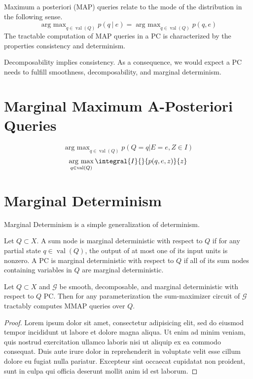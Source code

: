 \documentclass[9pt,fleqn,twoside,twocolumn]{stdglobal}
\DeclareMathOperator*{\argmax}{arg\ max}
\DeclareMathOperator{\val}{val}
\begin{document}
  Maximum a posteriori (MAP) queries relate to the mode of the distribution in the following sense.
  \[
    \argmax_{q\in\val(Q)} p(q\ |\ e) = \argmax_{q\in\val(Q)} p(q, e)
  \]
  The tractable computation of MAP queries in a PC is characterized by the properties consistency and determinism.

  Decomposability implies consistency.
  As a consequence, we would expect a PC needs to fulfill smoothness, decomposability, and marginal determinism.

\section{Marginal Maximum A-Posteriori Queries}
  \begin{definition*}
    \[
      \argmax_{q\in \val(Q)} p(Q = q | E = e, Z\in I)
    \]
    \[
      \argmax_{q\in \val(Q)} \integral{I}{}{p(q,e,z)}{z}
    \]
  \end{definition*}

\section{Marginal Determinism}
  Marginal Determinism is a simple generalization of determinism.
  \begin{definition*}
    Let $Q\subset X$.
    A sum node is marginal deterministic with respect to $Q$ if for any partial state $q\in\val(Q)$, the output of at most one of its input units is nonzero.
    A PC is marginal deterministic with respect to $Q$ if all of its sum nodes containing variables in $Q$ are marginal deterministic.
  \end{definition*}

  \begin{theorem*}
    Let $Q\subset X$ and $\mathscr{G}$ be smooth, decomposable, and marginal deterministic with respect to $Q$ PC.
    Then for any parameterization the sum-maximizer circuit of $\mathscr{G}$ tractably computes MMAP queries over $Q$.
  \end{theorem*}
  \begin{proof}
    Lorem ipsum dolor sit amet, consectetur adipisicing elit, sed do eiusmod
    tempor incididunt ut labore et dolore magna aliqua. Ut enim ad minim veniam,
    quis nostrud exercitation ullamco laboris nisi ut aliquip ex ea commodo
    consequat. Duis aute irure dolor in reprehenderit in voluptate velit esse
    cillum dolore eu fugiat nulla pariatur. Excepteur sint occaecat cupidatat non
    proident, sunt in culpa qui officia deserunt mollit anim id est laborum.
  \end{proof}
\end{document}
